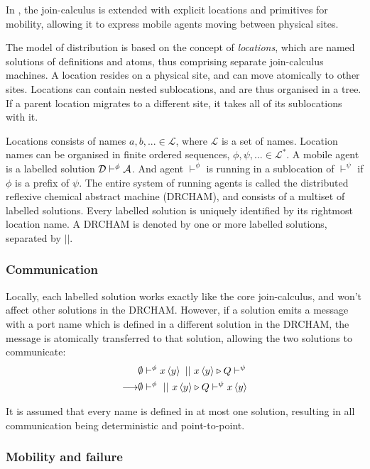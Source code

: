 In \cite{fournet1996calculus}, the join-calculus is extended with explicit
locations and primitives for mobility, allowing it to express mobile agents
moving between physical sites.

The model of distribution is based on the concept of \emph{locations}, which
are named solutions of definitions and atoms, thus comprising separate
join-calculus machines. A location resides on a physical site, and can move
atomically to other sites. Locations can contain nested sublocations, and are
thus organised in a tree. If a parent location migrates to a different site, it
takes all of its sublocations with it.

Locations consists of names $a,b,... \in \mathcal{L}$, where $\mathcal{L}$ is a
set of names. Location names can be organised in finite ordered sequences,
$\phi, \psi, ... \in \mathcal{L}^*$. A mobile agent is a labelled solution $\mathcal{D}
\vdash^\phi \mathcal{A}$. And agent $\vdash^\phi$ is running in a sublocation of
$\vdash^\psi$ if $\phi$ is a prefix of $\psi$. The entire system of running
agents is called the distributed reflexive chemical abstract machine (DRCHAM),
and consists of a multiset of labelled solutions. Every labelled solution is
uniquely identified by its rightmost location name. A DRCHAM is denoted by one
or more labelled solutions, separated by $||$.


\subsubsection{Communication}
Locally, each labelled solution works exactly like the core join-calculus, and
won't affect other solutions in the DRCHAM. However, if a solution emits a
message with a port name which is defined in a different solution in the DRCHAM,
the message is atomically transferred to that solution, allowing the two
solutions to communicate:
\begin{align*}
 &\emptyset \vdash^\phi \atm x<y> ~||~ \atm x<y> \triangleright Q \vdash^\psi \\
 \longrightarrow& \emptyset \vdash^\phi ~||~ \atm x<y> \triangleright Q
 \vdash^\psi \atm x<y>
\end{align*}

It is assumed that every name is defined in at most one solution, resulting in
all communication being deterministic and point-to-point.


\subsubsection{Mobility and failure}

